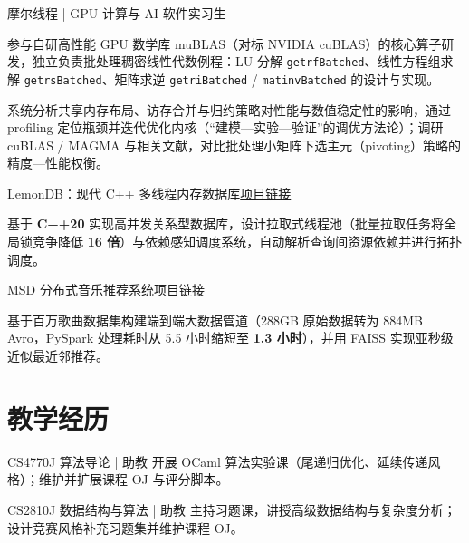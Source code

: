 \begin{joblong}{摩尔线程 | GPU 计算与 AI 软件实习生}{\DateMooreCn}
\item 参与自研高性能 GPU 数学库 muBLAS（对标 NVIDIA cuBLAS）的核心算子研发，独立负责批处理稠密线性代数例程：LU 分解 \texttt{getrfBatched}、线性方程组求解 \texttt{getrsBatched}、矩阵求逆 \texttt{getriBatched} / \texttt{matinvBatched} 的设计与实现。
\item 系统分析共享内存布局、访存合并与归约策略对性能与数值稳定性的影响，通过 profiling 定位瓶颈并迭代优化内核（“建模—实验—验证”的调优方法论）；调研 cuBLAS / MAGMA 与相关文献，对比批处理小矩阵下选主元（pivoting）策略的精度—性能权衡。
\end{joblong}

\begin{joblong}{LemonDB：现代 C++ 多线程内存数据库}{\href{https://github.com/zty2004/ECE4821Jp2}{项目链接}}
\item 基于 \textbf{C++20} 实现高并发关系型数据库，设计拉取式线程池（批量拉取任务将全局锁竞争降低 \textbf{16 倍}）与依赖感知调度系统，自动解析查询间资源依赖并进行拓扑调度。
\end{joblong}

\begin{joblong}{MSD 分布式音乐推荐系统}{\href{https://github.com/zty2004/ECE4721J}{项目链接}}
\item 基于百万歌曲数据集构建端到端大数据管道（288GB 原始数据转为 884MB Avro，PySpark 处理耗时从 5.5 小时缩短至 \textbf{1.3 小时}），并用 FAISS 实现亚秒级近似最近邻推荐。
\end{joblong}


\section{教学经历}

\begin{jobshort}{CS4770J 算法导论 | 助教}{\DateTACn}
开展 OCaml 算法实验课（尾递归优化、延续传递风格）；维护并扩展课程 OJ 与评分脚本。
\end{jobshort}

\begin{jobshort}{CS2810J 数据结构与算法 | 助教}{\DateTACn}
主持习题课，讲授高级数据结构与复杂度分析；设计竞赛风格补充习题集并维护课程 OJ。
\end{jobshort}
